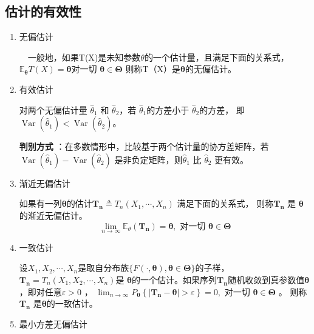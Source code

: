 \subsection{估计的有效性}
	\begin{enumerate}[1)]
		\item 无偏估计
		\setlength{\parindent}{2\ccwd}
		\begin{mydef}
		\ \ 一般地，如果T(X)是未知参数$ \theta $的一个估计量，且满足下面的关系式，$ \mathbb{E}_{\boldsymbol{\theta}} T(X)= \boldsymbol{\theta} $对一切
		$ \boldsymbol{ \theta \in \Theta }$ 则称T（X）是$ \boldsymbol{ \theta } $的无偏估计。
		\end{mydef}
		\item 有效估计
		\begin{mydef} 
			对两个无偏估计量 $ \hat{\theta}_{1} $ 和 $ \hat{\theta}_{2} $，若 $ \hat{\theta}_{1} $的方差小于 $ \hat{\theta}_{2} $的方差，
		即$ \operatorname{Var}\left(\hat{\theta}_{1}\right)<\operatorname{Var}\left(\hat{\theta}_{2}\right) $。
		\end{mydef}

		{\bf 判别方式 } ：在多数情形中，比较基于两个估计量的协方差矩阵，若$ \operatorname{Var}\left(\hat{\theta}_{1}\right)-\operatorname{Var}\left(\hat{\theta}_{2}\right) $
		是非负定矩阵，则$ \hat{\theta}_{1} $ 比 $ \hat{\theta}_{2} $ 更有效。
		\item 渐近无偏估计 
		
        如果有一列$ \boldsymbol{\theta } $的估计$ \boldsymbol{ T_{n} } \triangleq T_{n} \left(X_{1}, \cdots, X_{n}\right) $ 满足下面的关系式，
        则称$ \boldsymbol{ T_n } $ 是 $ \boldsymbol{\theta} $的渐近无偏估计。
        $$ \lim _{n \rightarrow \infty} \mathbb{E}_{\theta}\left(\boldsymbol{T_{n}}\right)
                         =\boldsymbol{\theta}, \text { 对一切 } \boldsymbol{ \theta \in \Theta} $$
		\item 一致估计
		
        设$  X_1, X_2 , \cdots ,X_n $是取自分布族$ \{F(\cdot , \boldsymbol{\theta}), \boldsymbol{\theta \in \Theta}\} $的子样，
        $ \boldsymbol{ T_n }= T_n (X_1, X_2 , \cdots ,X_n) $是
		$ \boldsymbol{\theta} $的一个估计。如果序列{$ \boldsymbol{T_n} $}随机收敛到真参数值$ \boldsymbol{\theta} $，即对任意$ \varepsilon > 0 $ ， 
        $ \displaystyle \lim _{n \rightarrow \infty} P_{\boldsymbol{\theta}} 
                \left\{\left|\boldsymbol{T_{n}-\theta}\right| >\varepsilon\right\}=0, $  对一切 
		 $ \boldsymbol{\theta \in \Theta} $ 。
		则称$  \boldsymbol{T_n} $ 是$ \boldsymbol{\theta} $的一致估计。
		\item 最小方差无偏估计
		

\end{enumerate}
